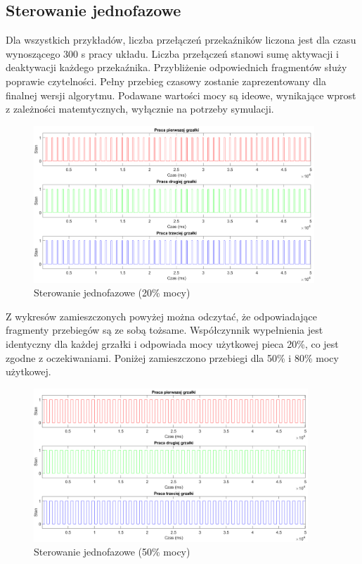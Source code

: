 \documentclass[a4paper,twoside,12pt]{book}
\begin{document}
\subsection{Sterowanie jednofazowe}
Dla wszystkich przykładów, liczba przełączeń przekaźników liczona jest dla czasu wynoszącego 300 s pracy układu. Liczba przełączeń stanowi sumę aktywacji i deaktywacji każdego przekaźnika. Przybliżenie odpowiednich fragmentów służy poprawie czytelności. Pełny przebieg czasowy zostanie zaprezentowany dla finalnej wersji algorytmu. Podawane wartości mocy są ideowe, wynikające wprost z zależności matemtycznych, wyłącznie na potrzeby symulacji.

\begin{figure}[h]
	\centering
	\includegraphics[width=0.94\textwidth]{./wykresy/png/onePhase20.png}
	\caption{Sterowanie jednofazowe (20\% mocy)}
	\label{fig:OnePhase20}
\end{figure}

\newpage
Z wykresów zamieszczonych powyżej można odczytać, że odpowiadające fragmenty przebiegów są ze sobą tożsame. Współczynnik wypełnienia jest identyczny dla każdej grzałki i odpowiada mocy użytkowej pieca 20\%, co jest zgodne z oczekiwaniami. Poniżej zamieszczono przebiegi dla 50\% i 80\% mocy użytkowej.

\begin{figure}[h]
	\centering
	\includegraphics[width=0.92\textwidth]{./wykresy/png/onePhase50.png}
	\caption{Sterowanie jednofazowe (50\% mocy)}
	\label{fig:OnePhase50}
\end{figure}
\end{document}
